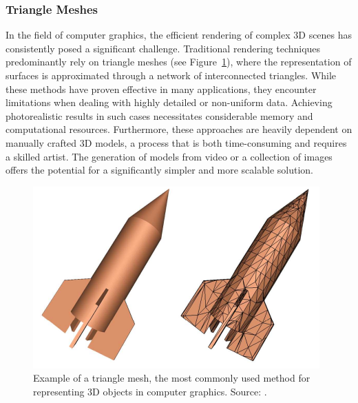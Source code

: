 \documentclass[12pt]{article}
\begin{document}
\subsubsection{Triangle Meshes}
In the field of computer graphics, the efficient rendering of complex 3D scenes has consistently posed a significant challenge. Traditional rendering techniques predominantly rely on triangle meshes (see Figure~\ref{fig:trianglemesh}), where the representation of surfaces is approximated through a network of interconnected triangles. While these methods have proven effective in many applications, they encounter limitations when dealing with highly detailed or non-uniform data. Achieving photorealistic results in such cases necessitates considerable memory and computational resources. Furthermore, these approaches are heavily dependent on manually crafted 3D models, a process that is both time-consuming and requires a skilled artist. The generation of models from video or a collection of images offers the potential for a significantly simpler and more scalable solution.
\begin{figure}[h!]
	\centering
	\includegraphics[width=\textwidth]{Images/TriangleMesh.png}
	\caption{Example of a triangle mesh, the most commonly used method for representing 3D objects in computer graphics. Source: \cite{Mesh}.}
	\label{fig:trianglemesh}
\end{figure}
\FloatBarrier
\noindent
\end{document}

